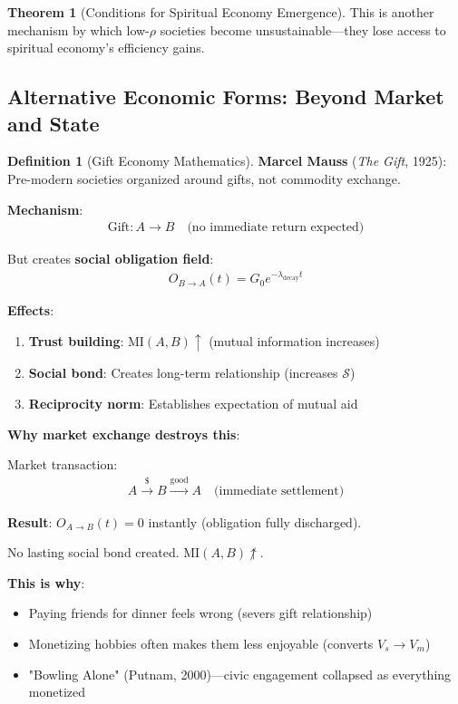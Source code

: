 \documentclass[11pt,a4paper]{article}
\theoremstyle{definition}
\newtheorem{definition}{Definition}[section]
\newtheorem{theorem}{Theorem}[section]
\theoremstyle{remark}
\begin{document}
\begin{enumerate}
\begin{theorem}[Conditions for Spiritual Economy Emergence]
This is another mechanism by which low-\(\rho\) societies become unsustainable—they lose access to spiritual economy's efficiency gains.
\end{theorem}

\subsection{Alternative Economic Forms: Beyond Market and State}

\begin{definition}[Gift Economy Mathematics]
\textbf{Marcel Mauss} (\textit{The Gift}, 1925): Pre-modern societies organized around gifts, not commodity exchange.

\textbf{Mechanism}:
\begin{align}
\text{Gift}: A \to B \quad \text{(no immediate return expected)}
\end{align}

But creates \textbf{social obligation field}:
\begin{align}
O_{B \to A}(t) = G_0 e^{-\lambda_{\text{decay}} t}
\end{align}

\textbf{Effects}:
\begin{enumerate}
    \item \textbf{Trust building}: \(\text{MI}(A, B) \uparrow\) (mutual information increases)
    \item \textbf{Social bond}: Creates long-term relationship (increases \(\mathcal{S}\))
    \item \textbf{Reciprocity norm}: Establishes expectation of mutual aid
\end{enumerate}

\textbf{Why market exchange destroys this}:

Market transaction:
\begin{align}
A \xrightarrow{\text{\$}} B \xrightarrow{\text{good}} A \quad \text{(immediate settlement)}
\end{align}

\textbf{Result}: \(O_{A \to B}(t) = 0\) instantly (obligation fully discharged).

No lasting social bond created. \(\text{MI}(A, B) \not\uparrow\).

\textbf{This is why}:
\begin{itemize}
    \item Paying friends for dinner feels wrong (severs gift relationship)
    \item Monetizing hobbies often makes them less enjoyable (converts \(V_s \to V_m\))
    \item "Bowling Alone" (Putnam, 2000)—civic engagement collapsed as everything monetized
\end{itemize}


\end{definition}
\end{enumerate}
\end{document}
